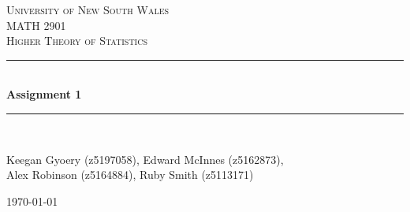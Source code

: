 \documentclass[a4paper]{article}
\begin{document}
\newlength{\strutheight}
\settoheight{\strutheight}{\strut}

\begin{titlepage}

\newcommand{\HRule}{\rule{\linewidth}{0.5mm}} %

\center %
 
\textsc{\LARGE University of New South Wales}\\[1.5cm] %
\textsc{\Large MATH 2901}\\[0.5cm] %
\textsc{\large Higher Theory of Statistics}\\[0.5cm] %

\HRule \\[0.4cm]
{ \huge \bfseries Assignment 1}\\[0.4cm] %
\HRule \\[1.5cm]


\begin{center} \large
Keegan Gyoery (z5197058), Edward McInnes (z5162873),\\ Alex Robinson (z5164884), Ruby Smith (z5113171) %
\\
\end{center}


\vspace{4cm}

{\today}\\[3cm] %

\vfill %

\end{titlepage}

\end{document}
